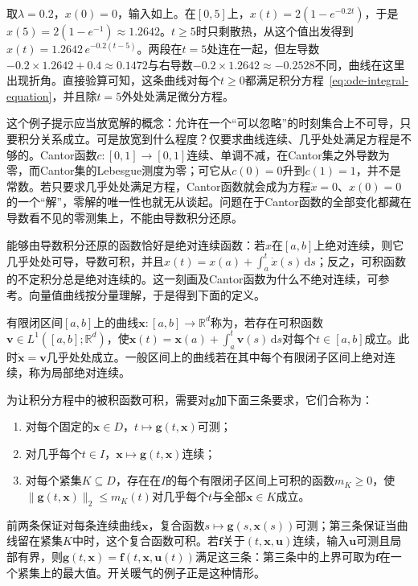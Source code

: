 \begin{example}[开关暖气下的温差]
  \label{ex:ode-switched-heating}
  取$\lambda=0.2$，$x(0)=0$，输入如上。在$[0,5]$上，$x(t)=2(1-e^{-0.2t})$，于是$x(5)=2(1-e^{-1})\approx1.2642$。$t\geq5$时只剩散热，从这个值出发得到$x(t)=1.2642\,e^{-0.2(t-5)}$。两段在$t=5$处连在一起，但左导数$-0.2\times1.2642+0.4\approx0.1472$与右导数$-0.2\times1.2642\approx-0.2528$不同，曲线在这里出现折角。直接验算可知，这条曲线对每个$t\geq0$都满足积分方程~\eqref{eq:ode-integral-equation}，并且除$t=5$外处处满足微分方程。
\end{example}

这个例子提示应当放宽解的概念：允许在一个“可以忽略”的时刻集合上不可导，只要积分关系成立。可是放宽到什么程度？仅要求曲线连续、几乎处处满足方程是不够的。Cantor函数$c:[0,1]\to[0,1]$连续、单调不减，在Cantor集之外导数为零，而Cantor集的Lebesgue测度为零；可它从$c(0)=0$升到$c(1)=1$，并不是常数。若只要求几乎处处满足方程，Cantor函数就会成为方程$\dot x=0$、$x(0)=0$的一个“解”，零解的唯一性也就无从谈起。问题在于Cantor函数的全部变化都藏在导数看不见的零测集上，不能由导数积分还原。

能够由导数积分还原的函数恰好是绝对连续函数：若$x$在$[a,b]$上绝对连续，则它几乎处处可导，导数可积，并且$x(t)=x(a)+\int_a^t\dot x(s)\,\mathrm ds$；反之，可积函数的不定积分总是绝对连续的。这一刻画及Cantor函数为什么不绝对连续，可参考。向量值曲线按分量理解，于是得到下面的定义。

\begin{definition}[绝对连续曲线]
  \label{def:ode-absolutely-continuous-curve}
  有限闭区间$[a,b]$上的曲线$\bm x:[a,b]\to\mathbb R^d$称为，若存在可积函数$\bm v\in L^1([a,b];\mathbb R^d)$，使$\bm x(t)=\bm x(a)+\int_a^t\bm v(s)\,\mathrm ds$对每个$t\in[a,b]$成立。此时$\dot{\bm x}=\bm v$几乎处处成立。一般区间上的曲线若在其中每个有限闭子区间上绝对连续，称为局部绝对连续。
\end{definition}

为让积分方程中的被积函数可积，需要对$\bm g$加下面三条要求，它们合称为：
\begin{enumerate}
  \item 对每个固定的$\bm x\in D$，$t\mapsto\bm g(t,\bm x)$可测；
  \item 对几乎每个$t\in I$，$\bm x\mapsto\bm g(t,\bm x)$连续；
  \item 对每个紧集$K\subseteq D$，存在在$I$的每个有限闭子区间上可积的函数$m_K\geq0$，使$\|\bm g(t,\bm x)\|_2\leq m_K(t)$对几乎每个$t$与全部$\bm x\in K$成立。
\end{enumerate}
前两条保证对每条连续曲线$\bm x$，复合函数$s\mapsto\bm g(s,\bm x(s))$可测；第三条保证当曲线留在紧集$K$中时，这个复合函数可积。若$\bm f$关于$(t,\bm x,\bm u)$连续，输入$\bm u$可测且局部有界，则$\bm g(t,\bm x)=\bm f(t,\bm x,\bm u(t))$满足这三条：第三条中的上界可取为$\bm f$在一个紧集上的最大值。开关暖气的例子正是这种情形。

